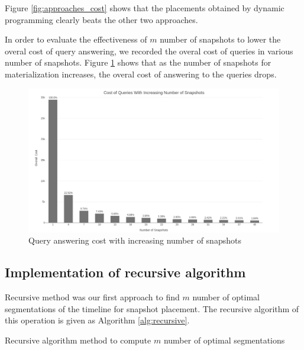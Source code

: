 			Figure \ref{fig:approaches_cost} shows that the placements obtained by dynamic programming clearly beats the other two approaches.

			In order to evaluate the effectiveness of $m$ number of snapshots to lower the overal cost of query answering, we recorded the overal cost of queries in various number of snapshots. Figure \ref{fig:snapshots_cost} shows that as the number of snapshots for materialization increases, the overal cost of answering to the queries drops.

			\begin{figure}
				\centering
				\includegraphics[width=\textwidth]{figs/various_snapshot.jpg}
				\caption{Query answering cost with increasing number of snapshots}
				\label{fig:snapshots_cost}
			\end{figure} 

		\subsection{Implementation of recursive algorithm} \label{sec:recursive_implementation}
			Recursive method was our first approach to find $m$ number of optimal segmentations of the timeline for snapshot placement. The recursive algorithm of this operation is given as Algorithm \ref{alg:recursive}.

			\begin{algorithm}
				\SetAlgoLined
				\caption{Recursive algorithm method to compute $m$ number of optimal segmentations}
				\SetAlCapNameFnt{\tiny}
				\label{alg:recursive}
				\DontPrintSemicolon
			\end{algorithm}


